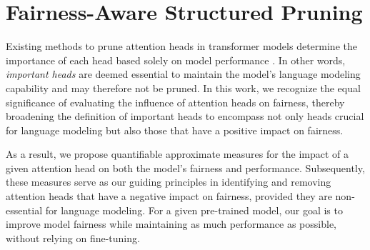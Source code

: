 \documentclass[letterpaper]{article} %
\begin{document}
\section{Fairness-Aware Structured Pruning}

Existing methods to prune attention heads in transformer models determine the importance of each head based solely on model performance \cite{voita-etal-2019-analyzing,NEURIPS2019_2c601ad9}. In other words, \textit{important heads} are deemed essential to maintain the model's language modeling capability and may therefore not be pruned. In this work, we recognize the equal significance of evaluating the influence of attention heads on fairness, thereby broadening the definition of important heads to encompass not only heads crucial for language modeling but also those that have a positive impact on fairness. 

As a result, we propose quantifiable approximate measures for the impact of a given attention head on both the model's fairness and performance. Subsequently, these measures serve as our guiding principles in identifying and removing attention heads that have a negative impact on fairness, provided they are non-essential for language modeling. %
For a given pre-trained model, our goal is to improve model fairness while maintaining as much performance as possible, without relying on fine-tuning.
\end{document}
